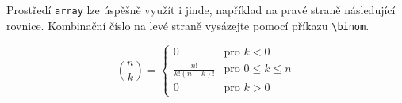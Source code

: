 \documentclass[twocolumn,11pt]{article}
\theoremstyle{plain}
\theoremstyle{plain}
\begin{document}
Prostředí \verb|array| lze úspěšně využít i jinde, například na pravé straně následující
rovnice. Kombinační číslo na levé straně vysázejte pomocí příkazu \verb|\binom|.

$$
\binom{n}{k} =
\left\{
\begin{array}{cl}
    0 & \textrm{pro } k < 0 \\
    \frac{n!}{k!(n-k)!} & \textrm{pro } 0 \leq k \leq n \\
    0 & \textrm{pro } k > 0
\end{array}
\right.
$$
\end{document}
